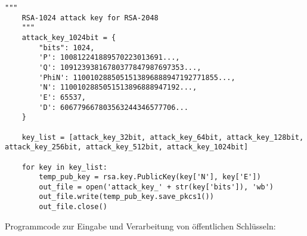 \begin{lstlisting}[language=PyBrIM]
    """
    RSA-1024 attack key for RSA-2048
    """
    attack_key_1024bit = {
        "bits": 1024,
        'P': 100812241889570223013691...,
        'Q': 10912393816780377847987697353...,
        'PhiN': 1100102885051513896888947192771855...,
        'N': 1100102885051513896888947192...,
        'E': 65537,
        'D': 606779667803563244346577706...
    }
    
    key_list = [attack_key_32bit, attack_key_64bit, attack_key_128bit, attack_key_256bit, attack_key_512bit, attack_key_1024bit]
    
    for key in key_list:
        temp_pub_key = rsa.key.PublicKey(key['N'], key['E'])
        out_file = open('attack_key_' + str(key['bits']), 'wb')
        out_file.write(temp_pub_key.save_pkcs1())
        out_file.close()
\end{lstlisting}

\newpage
Programmcode zur Eingabe und Verarbeitung von öffentlichen Schlüsseln:

